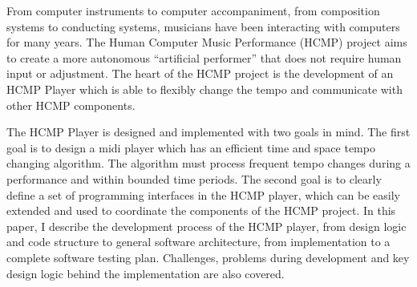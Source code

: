 


\begin{abstracts}
From computer instruments to computer accompaniment, from composition
systems to conducting systems, musicians have been interacting with
computers for many years. The Human Computer Music Performance (HCMP)
project aims to create a more autonomous ``artificial  performer'' that does
not require human input or adjustment. The heart of the HCMP project is the
development of an HCMP Player which is able to flexibly change the tempo and
communicate with other HCMP components.

The HCMP Player is designed and implemented with two goals in mind. The
first goal is to design a midi player which has an efficient time and space
tempo changing algorithm. The algorithm must process frequent tempo changes
during a performance and within bounded time periods. The second goal is to
clearly define a set of programming interfaces in the HCMP player, which can
be easily extended and used to coordinate the components of the HCMP
project. In this paper, I describe the development process of the HCMP
player, from design logic and code structure to general software
architecture, from implementation to a complete software testing plan.
Challenges, problems during development and key design logic behind the
implementation are also covered.
\end{abstracts}
